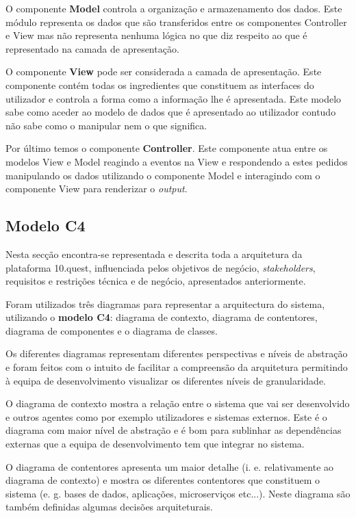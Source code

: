 O componente \textbf{Model} controla a organização e armazenamento dos dados. Este módulo representa os dados que são transferidos entre os componentes Controller e View mas não representa nenhuma lógica no que diz respeito ao que é representado na camada de apresentação.

O componente \textbf{View} pode ser considerada a camada de apresentação. Este componente contém todas os ingredientes que constituem as interfaces do utilizador e controla a forma como a informação lhe é apresentada. Este modelo sabe como aceder ao modelo de dados que é apresentado ao utilizador contudo não sabe como o manipular nem o que significa.

Por último temos o componente \textbf{Controller}.  Este componente atua entre os modelos View e Model reagindo a eventos na View e respondendo a estes pedidos manipulando os dados utilizando o componente Model e interagindo com o componente View para renderizar o \textit{output}.


\subsection{Modelo C4}

Nesta secção encontra-se representada e descrita toda a arquitetura da plataforma 10.quest,  influenciada pelos objetivos de negócio, \textit{stakeholders}, requisitos e restrições técnica e de negócio, apresentados anteriormente.

Foram utilizados três diagramas para representar a arquitectura do sistema, utilizando o \textbf{modelo C4}\cite{c4}: diagrama de contexto, diagrama de contentores, diagrama de componentes e o diagrama de classes.

Os diferentes diagramas representam diferentes perspectivas e níveis de abstração e foram feitos com o intuito de facilitar a compreensão da arquitetura permitindo à equipa de desenvolvimento visualizar os diferentes níveis de granularidade. 

O diagrama de contexto mostra a relação entre o sistema que vai ser desenvolvido e outros agentes como por exemplo utilizadores e sistemas externos.  Este é o diagrama com maior nível de abstração e é bom para sublinhar as dependências externas que a equipa de desenvolvimento tem que integrar no sistema. 

O diagrama de contentores apresenta um maior detalhe (i. e. relativamente ao diagrama de contexto) e mostra os diferentes contentores que constituem o sistema (e. g. bases de dados, aplicações, microserviços etc...). Neste diagrama são também definidas algumas decisões arquiteturais. 

